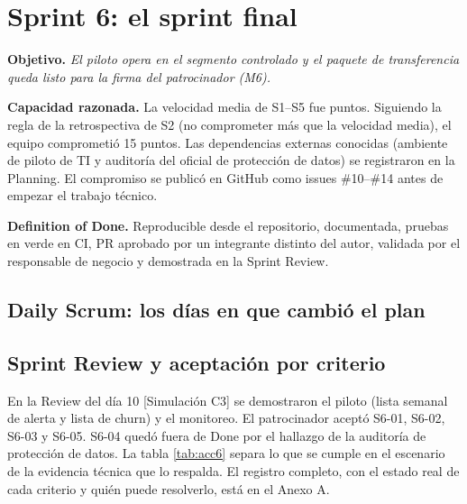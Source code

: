 \documentclass[10pt,a4paper]{article}
\newcommand{\rot}[1]{\textsf{\scriptsize\color{gris}[#1]}}
\begin{document}
\begin{table}[h]
\caption{Backlog de S3--S5 y su vínculo con objetivos e hitos}\label{tab:trace}

\end{table}

\section{Sprint 6: el sprint final}

\textbf{Objetivo.} \emph{El piloto opera en el segmento controlado y el paquete de transferencia queda listo para la firma del patrocinador (M6).}

\textbf{Capacidad razonada.} La velocidad media de S1--S5 fue \VelMedia{} puntos. Siguiendo la regla de la retrospectiva de S2 (no comprometer más que la velocidad media), el equipo comprometió 15 puntos. Las dependencias externas conocidas (ambiente de piloto de TI y auditoría del oficial de protección de datos) se registraron en la Planning. El compromiso se publicó en GitHub como issues \#10--\#14 antes de empezar el trabajo técnico.

\begin{table}[h]
\caption{Sprint Backlog de S6 (cada historia tiene criterios Dado/Cuando/Entonces y DoD en su issue)}\label{tab:s6}

\end{table}

\textbf{Definition of Done.} Reproducible desde el repositorio, documentada, pruebas en verde en CI, PR aprobado por un integrante distinto del autor, validada por el responsable de negocio y demostrada en la Sprint Review.

\subsection{Daily Scrum: los días en que cambió el plan}


\subsection{Sprint Review y aceptación por criterio}
En la Review del día 10 \rot{Simulación C3} se demostraron el piloto (lista semanal de alerta y lista de churn) y el monitoreo. El patrocinador aceptó S6-01, S6-02, S6-03 y S6-05. S6-04 quedó fuera de Done por el hallazgo de la auditoría de protección de datos. La tabla \ref{tab:acc6} separa lo que se cumple en el escenario de la evidencia técnica que lo respalda. El registro completo, con el estado real de cada criterio y quién puede resolverlo, está en el Anexo A.
\end{document}
